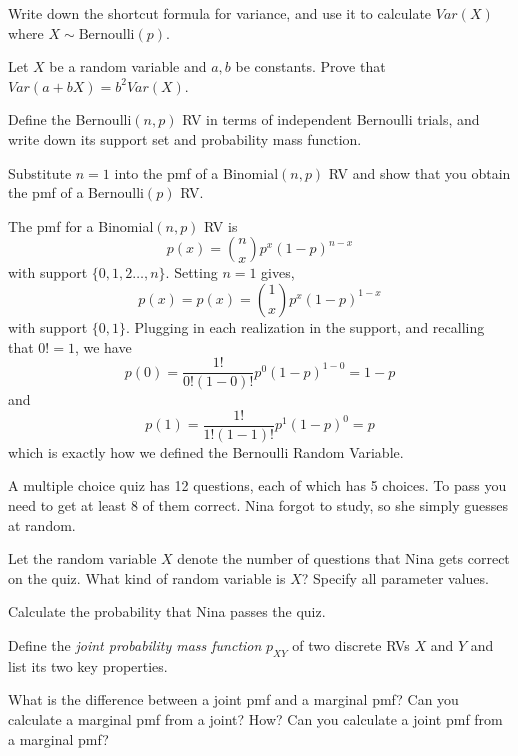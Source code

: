 \documentclass[addpoints,12pt]{exam}
\begin{document}
\begin{questions}
\question Write down the shortcut formula for variance, and use it to calculate $Var(X)$ where $X\sim\mbox{Bernoulli}(p)$. 

\question Let $X$ be a random variable and $a,b$ be constants. 
Prove that $Var(a + bX) = b^2 Var(X)$.

\question Define the Bernoulli$(n,p)$ RV in terms of independent Bernoulli trials, and write down its support set and probability mass function.

\question Substitute $n=1$ into the pmf of a Binomial$(n,p)$ RV and show that you obtain the pmf of a Bernoulli$(p)$ RV.
	\begin{solution}
		The pmf for a Binomial$(n,p)$ RV is
		$$p(x) = {n \choose x} p^x (1-p)^{n-x}$$
		with support $\{0, 1, 2\hdots, n\}$. Setting $n=1$ gives,
		$$p(x) = p(x) = {1 \choose x} p^x (1-p)^{1-x}$$
		with support $\{0,1\}$. Plugging in each realization in the support, and recalling that $0! = 1$, we have
			$$p(0) = \frac{1!}{0!(1-0)!} p^0 (1-p)^{1-0} = 1 - p$$
		and
		$$p(1) = \frac{1!}{1!(1-1)!} p^1 (1-p)^0 = p$$
		which is exactly how we defined the Bernoulli Random Variable.
	\end{solution}

\question A multiple choice quiz has 12 questions, each of which has 5 choices. To pass you need to get at least 8 of them correct. Nina forgot to study, so she simply guesses at random.
\begin{parts}
  \item Let the random variable $X$ denote the number of questions that Nina gets correct on the quiz. What kind of random variable is $X$? Specify all parameter values.
  \item Calculate the probability that Nina passes the quiz.
\end{parts}

		
\question Define the \emph{joint probability mass function} $p_{XY}$ of two discrete RVs $X$ and $Y$ and list its two key properties.

\question What is the difference between a joint pmf and a marginal pmf? Can you calculate a marginal pmf from a joint? How? Can you calculate a joint pmf from a marginal pmf?


\end{questions}
\end{document}
